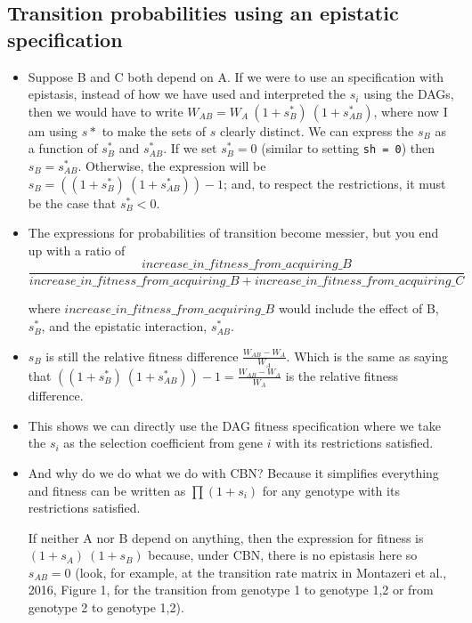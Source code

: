\documentclass[11pt]{article}
\begin{document}
\subsection{Transition probabilities using an epistatic specification}
\label{sec:orge68f649}
\begin{itemize}
\item Suppose B and C both depend on A. If we were to use an specification with epistasis, instead of how we have used and interpreted the \(s_i\) using the DAGs, then we would have to write \(W_{AB} = W_A \ (1 + s_B^*) \ (1 + s_{AB}^*)\), where now I am using \(s*\) to make the sets of \(s\) clearly distinct. We can express the \(s_B\) as a function of \(s_B^*\) and \(s_{AB}^*\). If we set \(s_B^* = 0\) (similar to setting \texttt{sh = 0}) then \(s_B = s_{AB}^*\). Otherwise, the expression will be \(s_B = ((1 + s_B^*)\ (1 + s_{AB}^*)) - 1\); and, to respect the restrictions, it must be the case that \(s_B^* < 0\).

\item The expressions for probabilities of transition become messier, but you end up with a ratio of \\
\[ \frac{increase\_in\_fitness\_from\_acquiring\_B}{increase\_in\_fitness\_from\_acquiring\_B + increase\_in\_fitness\_from\_acquiring\_C} \]

where \(increase\_in\_fitness\_from\_acquiring\_B\) would include the effect of B, \(s_B^*\), and the epistatic interaction, \(s_{AB}^*\).

\item \(s_B\) is still the relative fitness difference \(\frac{W_{AB} - W_A}{W_A}\). Which is the same as saying that \(((1 + s_B^*)\ (1 + s_{AB}^*)) - 1 = \frac{W_{AB} - W_A}{W_A}\) is the relative fitness difference.

\item This shows we can directly use the DAG fitness specification where we take the \(s_i\) as the selection coefficient from gene \(i\) with its restrictions satisfied.

\item And why do we do what we do with CBN? Because it simplifies everything and fitness can be written as \(\prod (1 + s_i)\) for any genotype with its restrictions satisfied. 

If neither A nor B depend on anything, then the expression for fitness is \((1 + s_A)\ (1 + s_B)\) because, under CBN, there is no epistasis here so \(s_{AB} = 0\) (look, for example, at the transition rate matrix in Montazeri et al., 2016, Figure 1, for the transition from genotype 1 to genotype 1,2 or from genotype 2 to genotype 1,2). 


\end{itemize}
\end{document}
